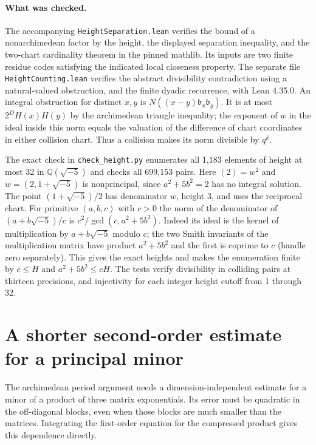 \documentclass[11pt,letterpaper]{article}
\begin{document}
\paragraph{What was checked.}
The accompanying \texttt{HeightSeparation.lean} verifies the bound of a nonarchimedean factor by the height, the displayed separation inequality, and the two-chart cardinality theorem in the pinned mathlib. Its inputs are two finite residue codes satisfying the indicated local closeness property. The separate file \texttt{HeightCounting.lean} verifies the abstract divisibility contradiction using a natural-valued obstruction, and the finite dyadic recurrence, with Lean 4.35.0. An integral obstruction for distinct $x,y$ is $N((x-y)\mathfrak b_x\mathfrak b_y)$. It is at most $2^D H(x)H(y)$ by the archimedean triangle inequality; the exponent of $w$ in the ideal inside this norm equals the valuation of the difference of chart coordinates in either collision chart. Thus a collision makes its norm divisible by $q^k$.

The exact check in \texttt{check\_height.py} enumerates all 1,183 elements of height at most 32 in $\mathbb Q(\sqrt{-5})$ and checks all 699,153 pairs. Here $(2)=w^2$ and $w=(2,1+\sqrt{-5})$ is nonprincipal, since $a^2+5b^2=2$ has no integral solution. The point $(1+\sqrt{-5})/2$ has denominator $w$, height $3$, and uses the reciprocal chart. For primitive $(a,b,c)$ with $c>0$ the norm of the denominator of $(a+b\sqrt{-5})/c$ is $c^2/\gcd(c,a^2+5b^2)$. Indeed its ideal is the kernel of multiplication by $a+b\sqrt{-5}$ modulo $c$; the two Smith invariants of the multiplication matrix have product $a^2+5b^2$ and the first is coprime to $c$ (handle zero separately). This gives the exact heights and makes the enumeration finite by $c\le H$ and $a^2+5b^2\le cH$. The tests verify divisibility in colliding pairs at thirteen precisions, and injectivity for each integer height cutoff from 1 through 32.
\section{A shorter second-order estimate for a principal minor}
\label{sec:compressed-minor}

The archimedean period argument needs a dimension-independent estimate for a minor
of a product of three matrix exponentials. Its error must be quadratic in the
off-diagonal blocks, even when those blocks are much smaller than the matrices.
Integrating the first-order equation for the compressed product gives this
dependence directly.
\end{document}
